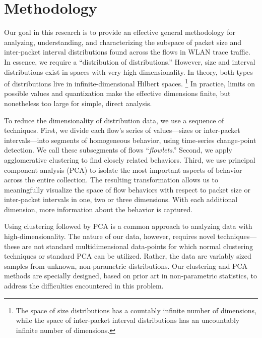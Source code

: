 \documentclass[conference]{IEEEtran}
\newcommand{\caps}[1]{{\small{#1}}}
\begin{document}
\section{Methodology}\label{sec:methodology}

Our goal in this research is to provide an effective general methodology for analyzing, understanding, and characterizing the subspace of packet size and inter-packet interval distributions found across the flows in \caps{WLAN} trace traffic. In essence, we require a ``distribution of distributions.'' %
However, size and interval distributions exist in spaces with very high dimensionality. In theory, both types of distributions live in infinite-dimensional Hilbert spaces.%
\footnote{The space of size distributions has a countably infinite number of dimensions, while the space of inter-packet interval distributions has an uncountably infinite number of dimensions.}
In practice, limits on possible values and quantization make the effective dimensions finite, but nonetheless too large for simple, direct analysis.%

To reduce the dimensionality of distribution data, we use a sequence of techniques.
First, we divide each flow's series of values---sizes or inter-packet intervals---into segments of homogeneous behavior, using time-series change-point detection. We call these subsegments of flows ``\textit{flowlets}.'' Second, we apply agglomerative clustering to find closely related behaviors. Third, we use principal component analysis (\caps{PCA}) to isolate the most important aspects of behavior across the entire collection. The resulting transformation allows us to meaningfully visualize the space of flow behaviors with respect to packet size or inter-packet intervals in one, two or three dimensions. With each additional dimension, more information about the behavior is captured. %

Using clustering followed by \caps{PCA} is a common approach to analyzing data with high-dimensionality. %
The nature of our data, however, requires novel techniques---these are not standard multidimensional data-points for which normal clustering techniques or standard \caps{PCA} can be utilized. Rather, the data are variably sized samples from unknown, non-parametric distributions. Our clustering and \caps{PCA} methods are specially designed, based on prior art in non-parametric statistics, to address the difficulties encountered in this problem.
\end{document}
